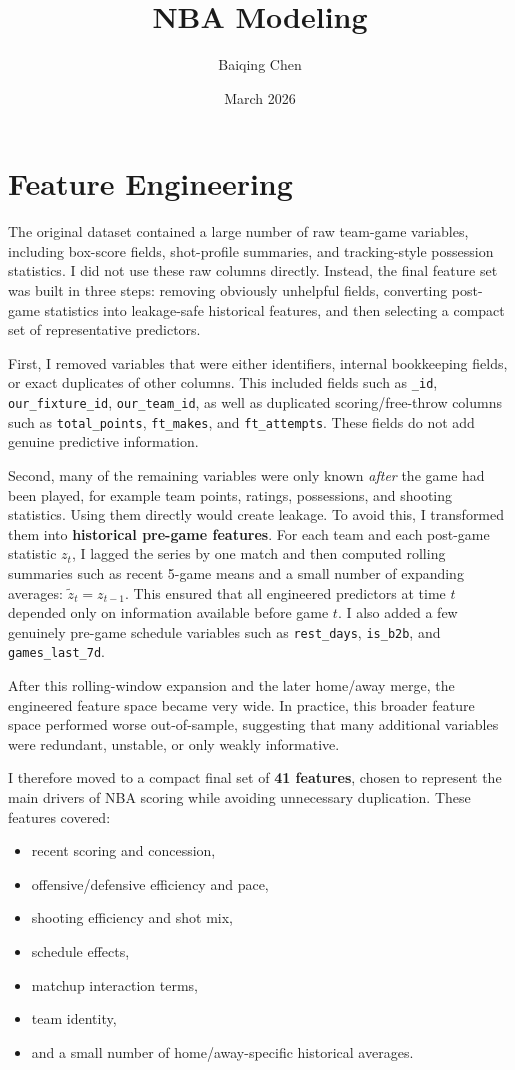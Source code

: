 \documentclass{article}
\title{NBA Modeling}
\author{Baiqing Chen}
\date{March 2026}
\begin{document}
\maketitle

\section{Feature Engineering}

The original dataset contained a large number of raw team-game variables, including box-score fields, shot-profile summaries, and tracking-style possession statistics. I did not use these raw columns directly. Instead, the final feature set was built in three steps: removing obviously unhelpful fields, converting post-game statistics into leakage-safe historical features, and then selecting a compact set of representative predictors.

First, I removed variables that were either identifiers, internal bookkeeping fields, or exact duplicates of other columns. This included fields such as \texttt{\_id}, \texttt{our\_fixture\_id}, \texttt{our\_team\_id}, as well as duplicated scoring/free-throw columns such as \texttt{total\_points}, \texttt{ft\_makes}, and \texttt{ft\_attempts}. These fields do not add genuine predictive information.

Second, many of the remaining variables were only known \emph{after} the game had been played, for example team points, ratings, possessions, and shooting statistics. Using them directly would create leakage. To avoid this, I transformed them into \textbf{historical pre-game features}. For each team and each post-game statistic $z_t$, I lagged the series by one match and then computed rolling summaries such as recent 5-game means and a small number of expanding averages:
$
\tilde{z}_t = z_{t-1}.
$
This ensured that all engineered predictors at time $t$ depended only on information available before game $t$. I also added a few genuinely pre-game schedule variables such as \texttt{rest\_days}, \texttt{is\_b2b}, and \texttt{games\_last\_7d}.

After this rolling-window expansion and the later home/away merge, the engineered feature space became very wide. In practice, this broader feature space performed worse out-of-sample, suggesting that many additional variables were redundant, unstable, or only weakly informative.

I therefore moved to a compact final set of \textbf{41 features}, chosen to represent the main drivers of NBA scoring while avoiding unnecessary duplication. These features covered:
\begin{itemize}
    \item recent scoring and concession,
    \item offensive/defensive efficiency and pace,
    \item shooting efficiency and shot mix,
    \item schedule effects,
    \item matchup interaction terms,
    \item team identity,
    \item and a small number of home/away-specific historical averages.
\end{itemize}
\end{document}
